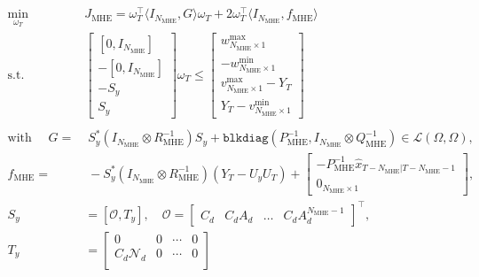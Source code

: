 \begin{equation} \label{eq:3_MHE_QP}
    \begin{aligned}
        \min_{\omega_T} \quad & J_{\mathrm{MHE}} = \omega_T^\top \langle I_{N_{\mathrm{MHE}}}, G \rangle \omega_T + 2 \omega_T^\top \langle I_{N_{\mathrm{MHE}}}, f_{\mathrm{MHE}} \rangle \\
        \text{s.t.} \quad &
        \begin{bmatrix}
        [0 , I_{N_{\mathrm{MHE}}}] \\
        -[0 , I_{N_{\mathrm{MHE}}}] \\
        -S_y \\
        S_y
        \end{bmatrix}
        \omega_T
        \leq
        \begin{bmatrix}
        w^{\max}_{{N_{\mathrm{MHE}}} \times 1} \\
        -w^{\min}_{{N_{\mathrm{MHE}}} \times 1} \\
        v^{\max}_{{N_{\mathrm{MHE}}} \times 1} - Y_T \\
        Y_T - v^{\min}_{{N_{\mathrm{MHE}}} \times 1}
        \end{bmatrix} \\
        \\
        \text{with } \quad
        G = &\; S_y^\ast (I_{N_{\mathrm{MHE}}} \otimes R_{\mathrm{MHE}}^{-1}) S_y + \texttt{blkdiag}(P_{\mathrm{MHE}}^{-1}, I_{N_{\mathrm{MHE}}} \otimes Q_{\mathrm{MHE}}^{-1}) \in \mathcal{L}(\Omega,\Omega), \\[1ex]
        f_{\mathrm{MHE}} = &\; -S_y^\ast (I_{N_{\mathrm{MHE}}} \otimes R_{\mathrm{MHE}}^{-1}) (Y_T - U_y U_T) + 
        \begin{bmatrix}
        -P_{\mathrm{MHE}}^{-1} \hat{x}_{T-{N_{\mathrm{MHE}}}|T-{N_{\mathrm{MHE}}}-1} \\
        0_{{N_{\mathrm{MHE}}} \times 1}
        \end{bmatrix}, \\[1ex]
        S_y &= [\mathcal{O}, T_y], \quad
        \mathcal{O} = 
        \begin{bmatrix}
        C_d &
        C_d A_d &
        \hdots &
        C_d A_d^{{N_{\mathrm{MHE}}}-1}
        \end{bmatrix}^\top, \\[1ex]
        T_y &=
        \begin{bmatrix}
        0 & 0 & \cdots & 0 \\
        C_d \mathcal{N}_d & 0 & \cdots & 0 \\

\end{bmatrix}
\end{aligned}
\end{equation}

